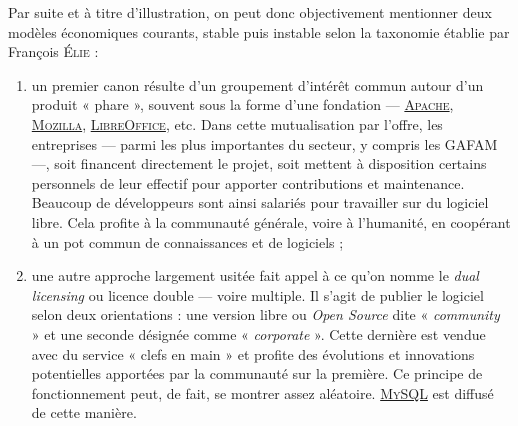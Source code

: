 Par suite et à titre d'illustration, on peut donc objectivement mentionner deux modèles économiques courants, stable puis instable selon la taxonomie établie par François \textsc{Élie} :
\begin{enumerate}
	\item un premier canon résulte d'un groupement d'intérêt commun autour d'un produit « phare », souvent sous la forme d'une fondation  --- \href{https://www.apache.org/}{\textsc{Apache}}, \href{https://foundation.mozilla.org/fr/}{\textsc{Mozilla}}, \href{https://www.documentfoundation.org/}{\textsc{LibreOffice}}, etc. Dans cette mutualisation par l'offre, les entreprises --- parmi les plus importantes du secteur, y compris les GAFAM ---, soit financent directement le projet, soit mettent à disposition certains personnels de leur effectif pour apporter contributions et maintenance. Beaucoup de développeurs sont ainsi salariés pour travailler sur du logiciel libre. Cela profite à la communauté générale, voire à l'humanité, en coopérant à un pot commun de connaissances et de logiciels ;
%
	\item une autre approche largement usitée fait appel à ce qu'on nomme le \textit{dual licensing} ou licence double --- voire multiple. Il s'agit de publier le logiciel selon deux orientations : une version libre ou \textit{Open Source} dite « \textit{community} » et une seconde désignée comme « \textit{corporate} ». Cette dernière est vendue avec du service « clefs en main » et profite des évolutions et innovations potentielles apportées par la communauté sur la première. Ce principe de fonctionnement peut, de fait, se montrer assez aléatoire. \href{https://www.mysql.com/fr/}{\textsc{MySQL}} est diffusé de cette manière. 

\end{enumerate}
